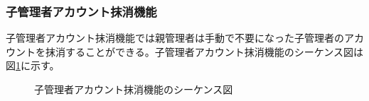 \documentclass[a4j]{jarticle}
\begin{document}
  \subsubsection{子管理者アカウント抹消機能}
  子管理者アカウント抹消機能では親管理者は手動で不要になった子管理者のアカウントを抹消することができる。子管理者アカウント抹消機能のシーケンス図は図\ref{fig:admin_children-delete.png}に示す。
  \begin{figure}[H]
    \centering
    \caption{子管理者アカウント抹消機能のシーケンス図}
    \label{fig:admin_children-delete.png}
  \end{figure}
  
\end{document}
